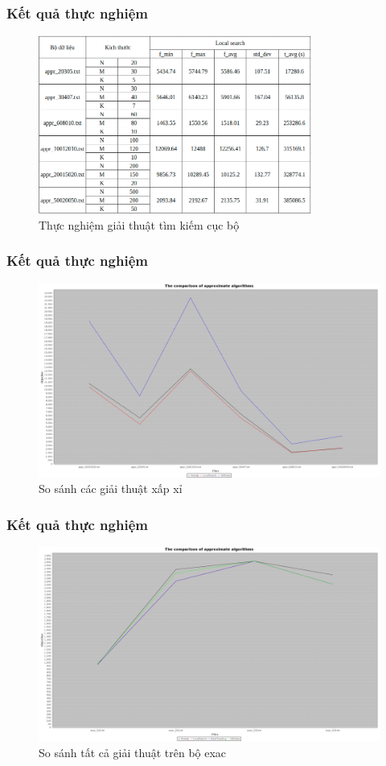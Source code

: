 \documentclass{beamer}
\begin{document}
	\begin{frame}
		\frametitle{Kết quả thực nghiệm}
		\begin{figure}
			\centering
			\caption{Thực nghiệm giải thuật tìm kiếm cục bộ}
			\includegraphics[width=0.8\textwidth]{images/localsearch.png}
		\end{figure}
	\end{frame}

	\begin{frame}
		\frametitle{Kết quả thực nghiệm}
		\begin{figure}
			\centering
			\caption{So sánh các giải thuật xấp xỉ}
			\includegraphics[width=\textwidth]{../result/image/comparison.png}
		\end{figure}
	\end{frame}
	\begin{frame}
		\frametitle{Kết quả thực nghiệm}
		\begin{figure}
			\centering
			\caption{So sánh tất cả giải thuật trên bộ exac}
			\includegraphics[width=\textwidth]{../result/image/comp.png}
		\end{figure}
	\end{frame}
\end{document}
